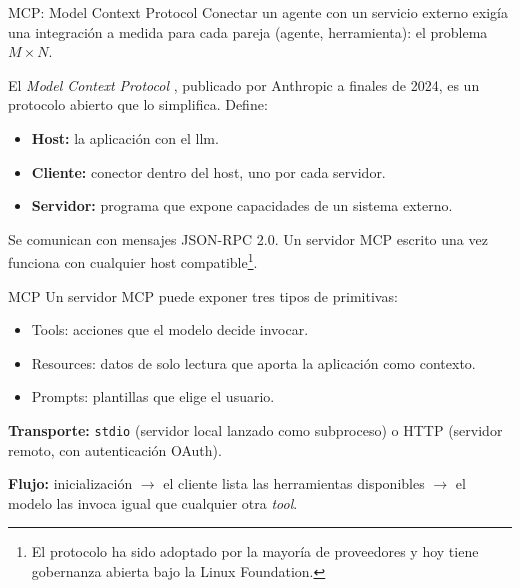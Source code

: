  
\begin{frame}{MCP: Model Context Protocol}
Conectar un agente con \alert{un servicio externo} exigía una integración a medida para cada pareja (agente, herramienta): el problema $M \times N$.
 
El \alert{\textit{Model Context Protocol}} \cite{anthropic2024mcp,mcpspec}, publicado por Anthropic a finales de 2024, es un \alert{protocolo abierto} que lo simplifica. Define:
 
\begin{itemize}
    \item \textbf{Host:} la aplicación con el \gls{llm}.
    \item \textbf{Cliente:} conector dentro del host, uno por cada servidor.
    \item \textbf{Servidor:} programa que \alert{expone capacidades} de un sistema externo.
\end{itemize}
 
Se comunican con mensajes \alert{JSON-RPC 2.0}. Un servidor MCP escrito una vez \alert{funciona con cualquier host compatible}\footnote{El protocolo ha sido adoptado por la mayoría de proveedores y hoy tiene gobernanza abierta bajo la Linux Foundation.}.
\end{frame}
 
\begin{frame}{MCP}
Un servidor MCP puede exponer tres tipos de \alert{primitivas}:
 
\begin{itemize}
    \item \alert{Tools:} acciones que el \alert{modelo} decide invocar.
    \item \alert{Resources:} datos de solo lectura que aporta la \alert{aplicación} como contexto.
    \item \alert{Prompts:} plantillas que elige el \alert{usuario}.
\end{itemize}
 
\textbf{Transporte:} \alert{\texttt{stdio}} (servidor local lanzado como subproceso) o \alert{HTTP} (servidor remoto, con autenticación OAuth).
 
\textbf{Flujo:} inicialización $\rightarrow$ el cliente lista las herramientas disponibles $\rightarrow$ el modelo las invoca igual que cualquier otra \textit{tool}.
\end{frame}
 
